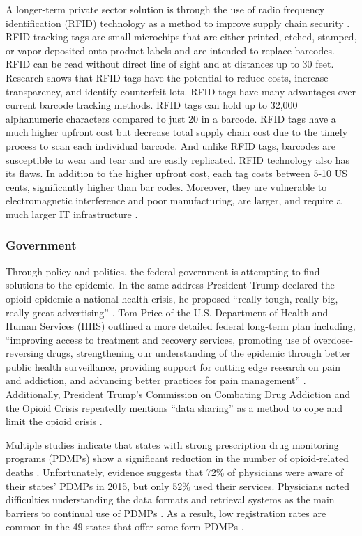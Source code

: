 \documentclass[sigconf]{acmart}
\begin{document}
A longer-term private sector solution is through the use of radio frequency identification (RFID) technology as a method to improve supply chain security \cite{Taylor01} \cite{Wyld01}. RFID tracking tags are small microchips that are either printed, etched, stamped, or vapor-deposited onto product labels and are intended to replace barcodes. RFID can be read without direct line of sight and at distances up to 30 feet. Research shows that RFID tags have the potential to reduce costs, increase transparency, and identify counterfeit lots. RFID tags have many advantages over current barcode tracking methods. RFID tags can hold up to 32,000 alphanumeric characters compared to just 20 in a barcode. RFID tags have a much higher upfront cost but decrease total supply chain cost due to the timely process to scan each individual barcode. And unlike RFID tags, barcodes are susceptible to wear and tear and are easily replicated. RFID technology also has its flaws. In addition to the higher upfront cost, each tag costs between 5-10 US cents, significantly higher than bar codes. Moreover, they are vulnerable to electromagnetic interference and poor manufacturing, are larger, and require a much larger IT infrastructure \cite{Taylor01} \cite{opsis9}.

\subsubsection{Government}
Through policy and politics, the federal government is attempting to find solutions to the epidemic. In the same address President Trump declared the opioid epidemic a national health crisis, he proposed ``really tough, really big, really great advertising'' \cite{opsis6}. Tom Price of the U.S. Department of Health and Human Services (HHS) outlined a more detailed federal long-term plan including, ``improving access to treatment and recovery services, promoting use of overdose-reversing drugs, strengthening our understanding of the epidemic through better public health surveillance, providing support for cutting edge research on pain and addiction, and advancing better practices for pain management'' \cite{opsis7}. Additionally, President Trump's Commission on Combating Drug Addiction and the Opioid Crisis repeatedly mentions ``data sharing'' as a method to cope and limit the opioid crisis \cite{opsis3}.

Multiple studies indicate that states with strong prescription drug monitoring programs (PDMPs) show a significant reduction in the number of opioid-related deaths \cite{pardo01} \cite{patrick01}. Unfortunately, evidence suggests that 72\% of physicians were aware of their states' PDMPs in 2015, but only 52\% used their services. Physicians noted difficulties understanding the data formats and retrieval systems as the main barriers to continual use of PDMPs \cite{Rutkow01}. As a result, low registration rates are common in the 49 states that offer some form PDMPs \cite{Hawk01}.
\end{document}
